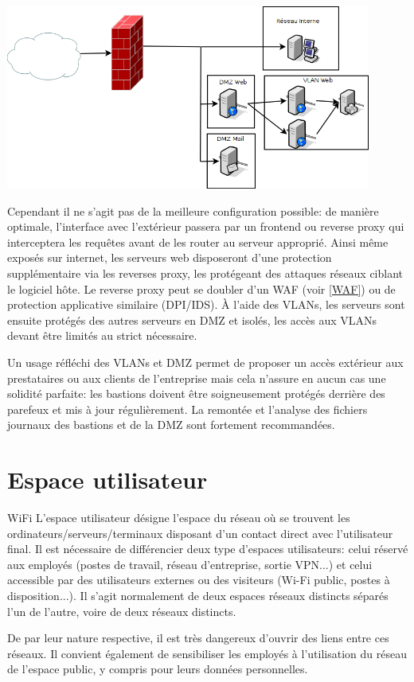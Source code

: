 \documentclass[twoside,a4paper,12pt,titlepage]{book}
\begin{document}
\includegraphics[width=0.9\textwidth]{DMZ_2.png}

Cependant il ne s'agit pas de la meilleure configuration possible: de manière optimale, l'interface avec l'extérieur passera par un frontend ou reverse proxy qui interceptera les requêtes avant de les router au serveur approprié. Ainsi même exposés sur internet, les serveurs web disposeront d'une protection supplémentaire via les reverses proxy, les protégeant des attaques réseaux ciblant le logiciel hôte. Le reverse proxy peut se doubler d'un WAF (voir \ref{WAF}) ou de protection applicative similaire (DPI/IDS). À l'aide des \gls{VLAN}s, les serveurs sont ensuite protégés des autres serveurs en DMZ et isolés, les accès aux VLANs devant être limités au strict nécessaire.

\begin{Warning}
	Un usage réfléchi des \gls{VLAN}s et DMZ permet de proposer un accès extérieur aux prestataires ou aux clients de l'entreprise mais cela n'assure en aucun cas une solidité parfaite: les bastions doivent être soigneusement protégés derrière des parefeux et mis à jour régulièrement. La remontée et l'analyse des fichiers journaux des bastions et de la DMZ sont fortement recommandées.
\end{Warning}

\section{Espace utilisateur\label{UserJumbo}}
\begin{Define}{\gls{WiFi}}
	L'espace utilisateur désigne l'espace du réseau où se trouvent les ordinateurs/serveurs/terminaux disposant d'un contact direct avec l'utilisateur final. Il est nécessaire de différencier deux type d'espaces utilisateurs: celui réservé aux employés (postes de travail, réseau d'entreprise, sortie VPN...) et celui accessible par des utilisateurs externes ou des visiteurs (Wi-Fi public, postes à disposition...). Il s'agit normalement de deux espaces réseaux distincts séparés l'un de l'autre, voire de deux réseaux distincts.
\end{Define}
\begin{Warning}
	De par leur nature respective, il est très dangereux d'ouvrir des liens entre ces réseaux. Il convient également de sensibiliser les employés à l'utilisation du réseau de l'espace public, y compris pour leurs données personnelles.
\end{Warning}
\end{document}
